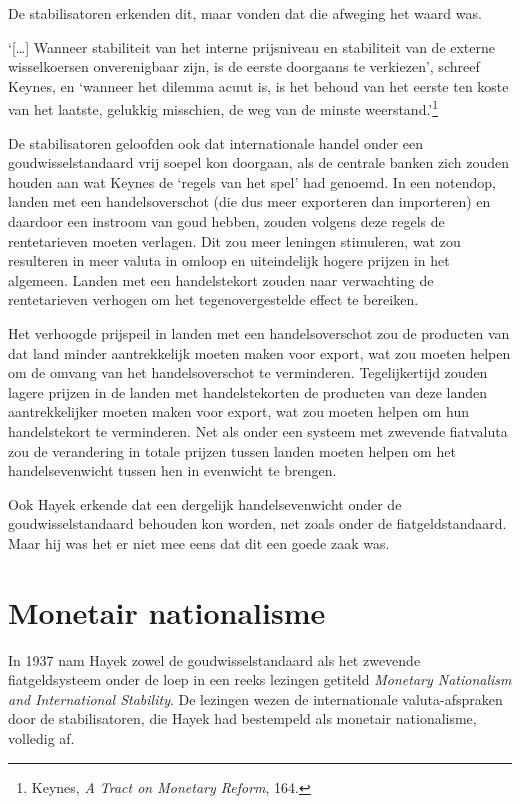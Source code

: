 \documentclass[
  a5paper,
  smalldemyvopaper,11pt,twoside,onecolumn,openright,extrafontsizes,
hidelinks]{memoir}
\begin{document}
De stabilisatoren erkenden dit, maar vonden dat die afweging het waard
was.

`{[}\ldots{]} Wanneer stabiliteit van het interne prijsniveau en
stabiliteit van de externe wisselkoersen onverenigbaar zijn, is de
eerste doorgaans te verkiezen', schreef Keynes, en `wanneer het dilemma
acuut is, is het behoud van het eerste ten koste van het laatste,
gelukkig misschien, de weg van de minste weerstand.'\footnote{\hspace{0pt}Keynes,
  \emph{A Tract on Monetary Reform}, 164.}

De stabilisatoren geloofden ook dat internationale handel onder een
goudwisselstandaard vrij soepel kon doorgaan, als de centrale banken
zich zouden houden aan wat Keynes de `regels van het spel' had genoemd.
In een notendop, landen met een handelsoverschot (die dus meer
exporteren dan importeren) en daardoor een instroom van goud hebben,
zouden volgens deze regels de rentetarieven moeten verlagen. Dit zou
meer leningen stimuleren, wat zou resulteren in meer valuta in omloop en
uiteindelijk hogere prijzen in het algemeen. Landen met een
handelstekort zouden naar verwachting de rentetarieven verhogen om het
tegenovergestelde effect te bereiken.

Het verhoogde prijspeil in landen met een handelsoverschot zou de
producten van dat land minder aantrekkelijk moeten maken voor export,
wat zou moeten helpen om de omvang van het handelsoverschot te
verminderen. Tegelijkertijd zouden lagere prijzen in de landen met
handelstekorten de producten van deze landen aantrekkelijker moeten
maken voor export, wat zou moeten helpen om hun handelstekort te
verminderen. Net als onder een systeem met zwevende fiatvaluta zou de
verandering in totale prijzen tussen landen moeten helpen om het
handelsevenwicht tussen hen in evenwicht te brengen.

Ook Hayek erkende dat een dergelijk handelsevenwicht onder de
goudwisselstandaard behouden kon worden, net zoals onder de
fiatgeldstandaard. Maar hij was het er niet mee eens dat dit een goede
zaak was.

\section{Monetair nationalisme}\label{monetair-nationalisme}

In 1937 nam Hayek zowel de goudwisselstandaard als het zwevende
fiatgeldsysteem onder de loep in een reeks lezingen getiteld
\emph{Monetary Nationalism and International Stability}. De lezingen
wezen de internationale valuta-afspraken door de stabilisatoren, die
Hayek had bestempeld als monetair nationalisme, volledig af.
\end{document}
